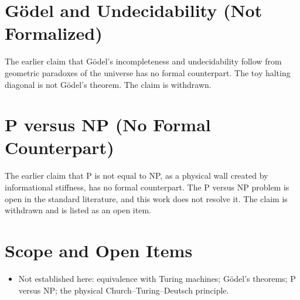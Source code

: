 \documentclass[11pt, a4paper]{article}
\begin{document}
\section{Gödel and Undecidability (Not Formalized)}
The earlier claim that Gödel's incompleteness and undecidability follow from geometric paradoxes of the universe has no formal counterpart. The toy halting diagonal is not Gödel's theorem. The claim is withdrawn.

\section{P versus NP (No Formal Counterpart)}
The earlier claim that P is not equal to NP, as a physical wall created by informational stiffness, has no formal counterpart. The P versus NP problem is open in the standard literature, and this work does not resolve it. The claim is withdrawn and is listed as an open item.

\section{Scope and Open Items}
\begin{itemize}
  \item Not established here: equivalence with Turing machines; Gödel's theorems; P versus NP; the physical Church--Turing--Deutsch principle.
\end{itemize}
\end{document}
